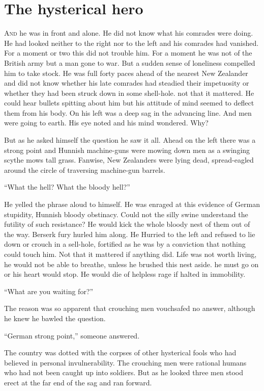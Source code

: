 \chapter*{\textsf{The hysterical hero}}

A\textsc{nd} he was in front and alone. He did not know what his comrades were doing. He had looked neither to the right nor to the left and his comrades had vanished. For a moment or two this did not trouble him. For a moment he was not of the British army but a man gone to war. But a sudden sense of loneliness compelled him to take stock. He was full forty paces ahead of the nearest New Zealander and did not know whether his late comrades had steadied their impetuosity or whether they had been struck down in some shell-hole. not that it mattered. He could hear bullets spitting about him but his attitude of mind seemed to deflect them from his body. On his left was a deep sag in the advancing line. And men were going to earth. His eye noted and his mind wondered. Why?

But as he asked himself the question he saw it all. Ahead on the left there was a strong point and Hunnish machine-guns were mowing down men as a swinging scythe mows tall grass. Fanwise, New Zealanders were lying dead, spread-eagled around the circle of traversing machine-gun barrels.

``What the hell? What the bloody hell?''

He yelled the phrase aloud to himself. He was enraged at this evidence of German stupidity, Hunnish bloody obstinacy. Could not the silly swine understand the futility of such resistance? He would kick the whole bloody nest of them out of the way. Berserk fury hurled him along. He Hurried to the left and refused to lie down or crouch in a sell-hole, fortified as he was by a conviction that nothing could touch him. Not that it mattered if anything did. Life was not worth living, he would not be able to breathe, unless he brushed this nest aside. he must go on or his heart would stop. He would die of helpless rage if halted in immobility.

``What are you waiting for?''

The reason was so apparent that crouching men vouchsafed no answer, although he knew he bawled the question.

``German strong point,'' someone answered.

The country was dotted with the corpses of other hysterical fools who had believed in personal invulnerability. The crouching men were rational humans who had not been caught up into soldiers. But as he looked three men stood erect at the far end of the sag and ran forward.

